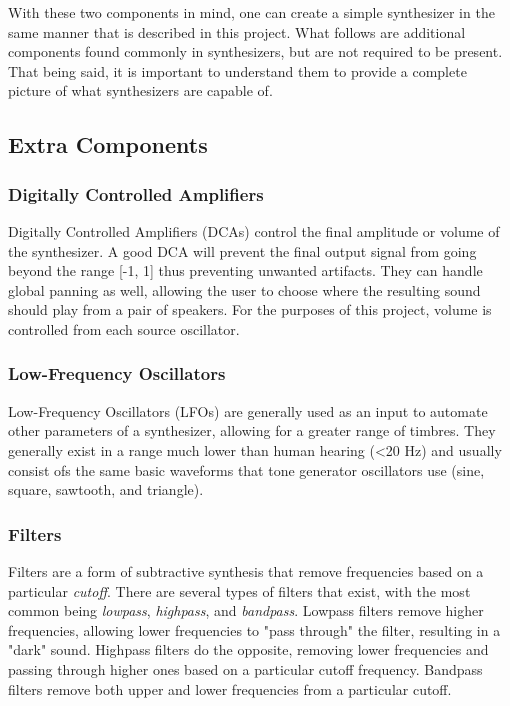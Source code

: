 \documentclass[12pt]{article}
\begin{document}
With these two components in mind, one can create a simple synthesizer in the same manner that is described in this project. What follows are additional components found commonly in synthesizers, but are not required to be present. That being said, it is important to understand them to provide a complete picture of what synthesizers are capable of. 

\subsection{Extra Components}

\subsubsection*{Digitally Controlled Amplifiers}
Digitally Controlled Amplifiers (DCAs) control the final amplitude or volume of the synthesizer. A good DCA will prevent the final output signal from going beyond the range [-1, 1] thus preventing unwanted artifacts. They can handle global panning as well, allowing the user to choose where the resulting sound should play from a pair of speakers. \cite{Pirkle_2015} For the purposes of this project, volume is controlled from each source oscillator.

\subsubsection*{Low-Frequency Oscillators}
Low-Frequency Oscillators (LFOs) are generally used as an input to automate other parameters of a synthesizer, allowing for a greater range of timbres. They generally exist in a range much lower than human hearing (\textless 20 Hz) and usually consist ofs the same basic waveforms that tone generator oscillators use (sine, square, sawtooth, and triangle).

\subsubsection*{Filters}
Filters are a form of subtractive synthesis that remove frequencies based on a particular \textit{cutoff}. There are several types of filters that exist, with the most common being \textit{lowpass}, \textit{highpass}, and \textit{bandpass}. Lowpass filters remove higher frequencies, allowing lower frequencies to "pass through" the filter, resulting in a "dark" sound. Highpass filters do the opposite, removing lower frequencies and passing through higher ones based on a particular cutoff frequency. Bandpass filters remove both upper and lower frequencies from a particular cutoff.
\end{document}
